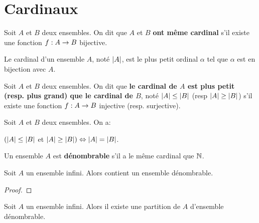 \chapter{Cardinaux}


\begin{definition}
	Soit $A$ et $B$ deux ensembles.
	On dit que $A$ et $B$ \textbf{ont même cardinal} s'il existe une fonction
	$f : A \rightarrow B$ bijective.
\end{definition}

\begin{definition}
	Le cardinal d'un ensemble $A$, noté $|A|$, est le plus petit ordinal
	$\alpha$ tel que $\alpha$ est en bijection avec $A$.
\end{definition}

\begin{definition}
	Soit $A$ et $B$ deux ensembles. On dit que \textbf{le cardinal de $A$ est
	plus petit (resp. plus grand) que le cardinal de $B$}, noté $|A| \leq
	|B|$ (resp $|A| \geq |B|$) s'il existe une fonction
	$f : A \rightarrow B$ injective (resp. surjective).
\end{definition}

\begin{theorem} 
	Soit $A$ et $B$ deux ensembles. On a:

	$(|A| \leq |B|$ et $|A| \geq |B|) \Leftrightarrow |A| =
	|B|$.
	\label{thm:csb}
\end{theorem}
\begin{definition}
	Un ensemble $A$ est \textbf{dénombrable} s'il a le même cardinal que
	$\mathbb{N}$.
\end{definition}

\begin{proposition}
	Soit $A$ un ensemble infini. Alors contient un ensemble dénombrable.
\end{proposition}

\begin{proof}
	
\end{proof}

\begin{proposition}
	\label{prop:infinite_set_partition}
	Soit $A$ un ensemble infini. Alors il existe une partition de $A$ d'ensemble
	dénombrable.
\end{proposition}


